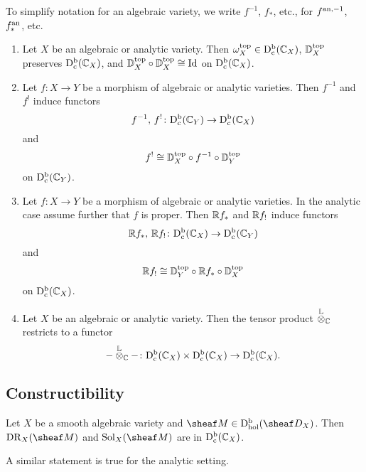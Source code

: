 \documentclass[number-in-sections,a4paper]{notes}
\begin{document}
To simplify notation for an algebraic variety, we write $f^{-1}$, $f_*$, etc., for $f^{{\mathrm{an}},-1}$, $f^{\mathrm{an}}_*$, etc.

\begin{Theorem}\leavevmode
    \begin{enumerate}
        \item Let $X$ be an algebraic or analytic variety.
            Then $\omega^{\mathrm{top}}_X \in \mathrm{D}^{\mathrm{b}}_{\mathrm{c}}({\mathbb{C}}_{X})$, $\mathbb{D}^{\mathrm{top}}_X$ preserves $\mathrm{D}^{\mathrm{b}}_{\mathrm{c}}({\mathbb{C}}_{X})$, and $\mathbb{D}^{\mathrm{top}}_X \circ \mathbb{D}^{\mathrm{top}}_X \cong {\mathrm{Id}_{}}$ on $\mathrm{D}^{\mathrm{b}}_{\mathrm{c}}({\mathbb{C}}_{X})$.
        \item Let $f\colon X \to Y$ be a morphism of algebraic or analytic varieties.
            Then $f^{-1}$ and $f^!$ induce functors
            \[
                f^{-1},\, f^!\colon \mathrm{D}^{\mathrm{b}}_{\mathrm{c}}({\mathbb{C}}_{Y}) \to \mathrm{D}^{\mathrm{b}}_{\mathrm{c}}({\mathbb{C}}_{X})
            \]
            and
            \[
                f^! \cong \mathbb{D}^{\mathrm{top}}_X \circ f^{-1} \circ \mathbb{D}^{\mathrm{top}}_Y
            \]
            on $\mathrm{D}^{\mathrm{b}}_{\mathrm{c}}({\mathbb{C}}_{Y})$.
        \item Let $f\colon X \to Y$ be a morphism of algebraic or analytic varieties.
            In the analytic case assume further that $f$ is proper.
            Then ${\mathbb{R}} f_*$ and ${\mathbb{R}} f_!$ induce functors
            \[
                {\mathbb{R}} f_*,\, {\mathbb{R}} f_!\colon \mathrm{D}^{\mathrm{b}}_{\mathrm{c}}({\mathbb{C}}_{X}) \to \mathrm{D}^{\mathrm{b}}_{\mathrm{c}}({\mathbb{C}}_{Y})
            \]
            and
            \[
                {\mathbb{R}} f_! \cong \mathbb{D}^{\mathrm{top}}_Y \circ {\mathbb{R}} f_* \circ \mathbb{D}^{\mathrm{top}}_X
            \]
            on $\mathrm{D}^{\mathrm{b}}_{\mathrm{c}}({\mathbb{C}}_{X})$.
        \item Let $X$ be an algebraic or analytic variety.
            Then the tensor product $\mathbin{\overset{{\mathbb{L}}}{\otimes}}_{{\mathbb{C}}}$ restricts to a functor
            \[
                - \mathbin{\overset{{\mathbb{L}}}{\otimes}}_{\mathbb{C}} -\colon \mathrm{D}^{\mathrm{b}}_{\mathrm{c}}({\mathbb{C}}_{X}) \times \mathrm{D}^{\mathrm{b}}_{\mathrm{c}}({\mathbb{C}}_{X}) \to \mathrm{D}^{\mathrm{b}}_{\mathrm{c}}({\mathbb{C}}_{X}).
            \]
    \end{enumerate}
\end{Theorem}

\subsection{Constructibility}

\begin{Theorem}
    Let $X$ be a smooth algebraic variety and $\sheaf M \in \catDbDModhol{X}$.
    Then $\DR_X(\sheaf M)$ and $\Sol_X(\sheaf M)$ are in $\mathrm{D}^{\mathrm{b}}_{\mathrm{c}}({\mathbb{C}}_{X})$.
\end{Theorem}

\begin{Remark}
    A similar statement is true for the analytic setting.
\end{Remark}
\end{document}
